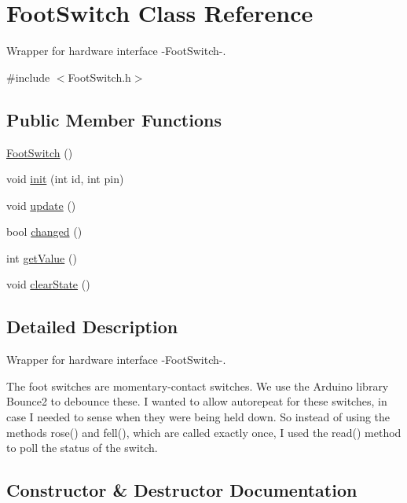 \hypertarget{class_foot_switch}{}\section{Foot\+Switch Class Reference}
\label{class_foot_switch}


Wrapper for hardware interface -\/\+Foot\+Switch-\/.  




{\ttfamily \#include $<$Foot\+Switch.\+h$>$}

\subsection*{Public Member Functions}
\begin{DoxyCompactItemize}
\item 
\mbox{\hyperlink{class_foot_switch_ae8a0b76b3a44b865bdcdc3851554ad58}{Foot\+Switch}} ()
\item 
void \mbox{\hyperlink{class_foot_switch_af9db72b8850c90fcd857aa97cdc6cc33}{init}} (int id, int pin)
\item 
void \mbox{\hyperlink{class_foot_switch_a3bda23682bf3dc91fefa3efa98e9cd1f}{update}} ()
\item 
bool \mbox{\hyperlink{class_foot_switch_abc055774bd30c4b6185f323d4e58789e}{changed}} ()
\item 
int \mbox{\hyperlink{class_foot_switch_ae93d6b174a73840c5b4d978435d58114}{get\+Value}} ()
\item 
void \mbox{\hyperlink{class_foot_switch_a2971bbc4bbc9b14001c350d29f8f7ae9}{clear\+State}} ()
\end{DoxyCompactItemize}


\subsection{Detailed Description}
Wrapper for hardware interface -\/\+Foot\+Switch-\/. 

The foot switches are momentary-\/contact switches. We use the Arduino library Bounce2 to debounce these. I wanted to allow autorepeat for these switches, in case I needed to sense when they were being held down. So instead of using the methods rose() and fell(), which are called exactly once, I used the read() method to poll the status of the switch. 

\subsection{Constructor \& Destructor Documentation}
\mbox{\label{class_foot_switch_ae8a0b76b3a44b865bdcdc3851554ad58}} 
